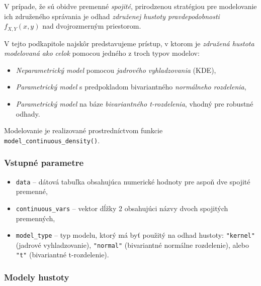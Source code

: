 V prípade, že sú obidve premenné \textit{spojité}, prirodzenou stratégiou pre modelovanie ich združeného správania je odhad \textit{združenej hustoty pravdepodobnosti} $f_{X,Y}(x, y)$ nad dvojrozmerným priestorom.

V tejto podkapitole najskôr predstavujeme prístup, v ktorom je \textit{združená hustota modelovaná ako celok} pomocou jedného z troch typov modelov:

\begin{itemize}
  \item \textit{Neparametrický model} pomocou \textit{jadrového vyhladzovania} (KDE),
  \item \textit{Parametrický model} s predpokladom bivariantného \textit{normálneho rozdelenia},
  \item \textit{Parametrický model} na báze \textit{bivariantného t-rozdelenia}, vhodný pre robustné odhady.
\end{itemize}

Modelovanie je realizované prostredníctvom funkcie \texttt{model\_continuous\_density()}.

\subsubsection{Vstupné parametre}

\begin{itemize}
  \item \texttt{data} – dátová tabuľka obsahujúca numerické hodnoty pre aspoň dve spojité premenné,
  \item \texttt{continuous\_vars} – vektor dĺžky 2 obsahujúci názvy dvoch spojitých premenných,
  \item \texttt{model\_type} – typ modelu, ktorý má byť použitý na odhad hustoty: \texttt{"kernel"} (jadrové vyhladzovanie), \texttt{"normal"} (bivariantné normálne rozdelenie), alebo \texttt{"t"} (bivariantné t-rozdelenie).
\end{itemize}

\subsubsection{Modely hustoty}

